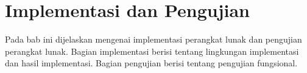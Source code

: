 \chapter{Implementasi dan Pengujian}
\label{chap:implementasiDanPengujian}

Pada bab ini dijelaskan mengenai implementasi perangkat lunak dan pengujian perangkat lunak. Bagian implementasi berisi tentang lingkungan implementasi dan hasil implementasi. Bagian pengujian berisi tentang pengujian fungsional.